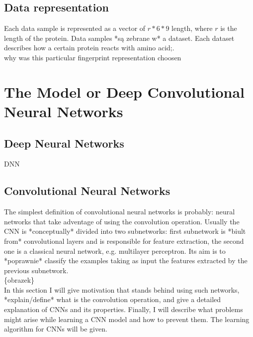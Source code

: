 \documentclass[a4paper,10pt]{report}
\begin{document}
    \section{Data representation} %
    Each data sample is represented as a vector of $r*6*9$ length, where $r$ is the length of the protein. Data samples *są zebrane w* a dataset. Each dataset describes how a certain protein reacts with amino acid;.\\
    
    why was this particular fingerprint representation choosen
    
    
  \chapter{The Model or Deep Convolutional Neural Networks}
    
    \section{Deep Neural Networks}
      DNN

    \section{Convolutional Neural Networks}
      The simplest definition of convolutional neural networks is probably: neural networks that take adventage of using the convolution operation. Usually the CNN is *conceptually* divided into two subnetworks: first subnetwork is *biult from* convolutional layers and is responsible for feature extraction, the second one is a classical neural network, e.g. multilayer perceptron. Its aim is to *poprawnie* classify the examples taking as input the features extracted by the previous subnetwork.\\
      
      \{obrazek\} \\ %
      
      In this section I will give motivation that stands behind using such networks, *explain/define* what is the convolution operation, and give a detailed explanation of CNNs and its properties. Finally, I will describe what problems might arise while learning a CNN model and how to prevent them. The learning algorithm for CNNs will be given.\\
      
\end{document}
